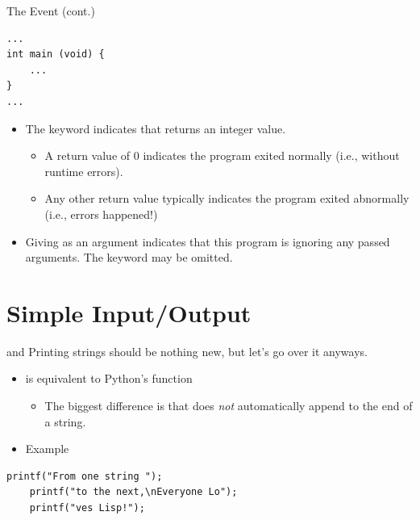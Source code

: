 \documentclass[11pt]{beamer}
\let\OldTexttt\texttt
\renewcommand{\texttt}[1]{\OldTexttt{\color{teal}{#1}}}
\begin{document}
\begin{frame}[fragile=singleslide]{The \texttt{main} Event (cont.)}
\begin{lstlisting}[style=C]
...
int main (void) { 
	...
}
...
\end{lstlisting}
\begin{itemize}
\item The \texttt{int} keyword indicates that \texttt{main} returns an integer value.
	\begin{itemize}
	\item A return value of 0 indicates the program exited normally (i.e., without runtime errors).
	\item Any other return value typically indicates the program exited abnormally (i.e., errors happened!)
	\end{itemize}
\item Giving \texttt{void} as an argument indicates that this program is ignoring any passed arguments.  The \texttt{void} keyword may be omitted.
\end{itemize}
\end{frame}

\section[I/O]{Simple Input/Output}
\begin{frame}[fragile=singleslide]{\texttt{printf()} and \texttt{stdout}}
Printing strings should be nothing new, but let's go over it anyways.
\begin{itemize}
    \item \texttt{printf()} is equivalent to Python's \texttt{print()} function
    \begin{itemize}
        \item The biggest difference is that \texttt{printf()} does \emph{not} automatically append \texttt{\textbackslash n} to the end of a string.
    \end{itemize}
    \item Example
\end{itemize}
\begin{lstlisting}[style=C]
	printf("From one string ");
	printf("to the next,\nEveryone Lo");
	printf("ves Lisp!");
\end{lstlisting}
\end{frame}
\end{document}
